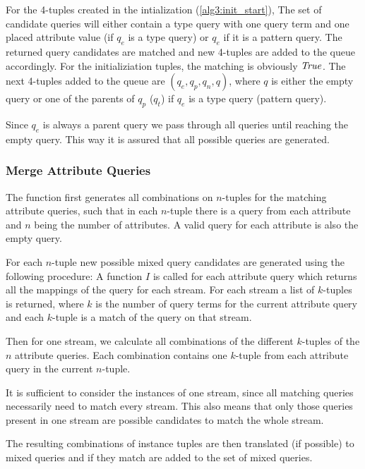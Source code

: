 For the 4-tuples created in the intialization
(\autoref{alg3:init_start}), The set of candidate queries
will either contain a type query
with one query term and one placed attribute value
(if $q_e$ is a type query) or $q_e$ if it is a pattern query.
The returned query candidates are matched and new
4-tuples are added to the queue accordingly.
For the initializiation tuples, the matching is obviously $\mathit{True}$.
The next 4-tuples added to the queue are
$(q_e, q_p, q_n, q)$, where $q$ is either the empty query or one
of the parents of $q_p$ ($q_t$) if $q_e$ is a type query (pattern query).

Since $q_e$ is always a parent query we pass through all queries until
reaching the empty query.
This way it is assured that all possible queries are generated.


\subsubsection{Merge Attribute Queries}
\label{sec:comp-att}
The function first generates all combinations on $n$-tuples
for the matching attribute queries, such that in each $n$-tuple there
is a query from each attribute and $n$ being the number of
attributes. A valid query for each attribute is also the empty query.

For each $n$-tuple new possible mixed query candidates are generated
using the following procedure:
A function $I$ is called for each attribute query which returns
all the mappings of the query for each stream. For each stream
a list of $k$-tuples is returned, where $k$ is the number
of query terms for the current attribute query and each $k$-tuple
is a match of the query on that stream.

Then for one stream, we calculate all combinations of the different
$k$-tuples of the $n$ attribute queries. Each combination contains
one $k$-tuple from each attribute query in the current $n$-tuple.

It is sufficient to consider the instances of one stream, since
all matching queries necessarily need to match every stream.
This also means that only those queries present in one stream
are possible candidates to match the whole stream.

The resulting combinations of instance tuples are then
translated (if possible) to mixed queries and if they match
are added to the set of mixed queries.
